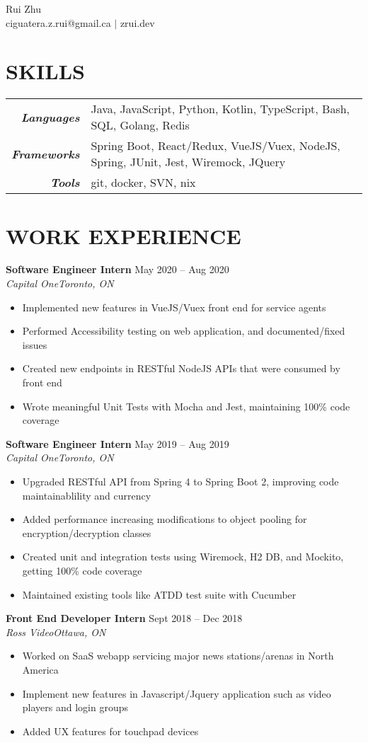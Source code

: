 \documentclass[8pt, letterpaper]{article}
\newcommand{\Header}[2]{\begin{center}
	\Huge\usefont{OT1}{lmss}{s}{n}
		#1 \\
	\small #2 \\
	\normalsize \normalfont
\end{center}}
\newcommand{\SplitEntry}[2]{\textbf{\textit{#1}} & #2\\}
\newcommand{\NewPart}[1]{\section*{\uppercase{\textbf{#1}}}}
\newcommand{\DatedEntry}[5]{\large\textbf{#1}
	\hfill #2\\\normalsize
	\textit{#3}\hfill\textit{#4}\\\vspace{0.10cm}
	#5
}
\begin{document}
\Header{Rui Zhu}{ciguatera.z.rui@gmail.ca $|$ zrui.dev}


\NewPart{Skills}{}
\begin{tabular}{r|l}
	\SplitEntry{Languages}{Java, JavaScript, Python, Kotlin, TypeScript, Bash, SQL, Golang, Redis}
	\SplitEntry{Frameworks}{Spring Boot, React/Redux, VueJS/Vuex, NodeJS, Spring, JUnit, Jest, Wiremock, JQuery}
	\SplitEntry{Tools}{git, docker, SVN, nix}
\end{tabular}


\NewPart{Work Experience}{}
\DatedEntry{Software Engineer Intern}
{May 2020 -- Aug 2020}
{Capital One}
{Toronto, ON}
{\begin{itemize}[nolistsep]
	\item Implemented new features in VueJS/Vuex front end for service agents 
	\item Performed Accessibility testing on web application, and documented/fixed issues
	\item Created new endpoints in RESTful NodeJS APIs that were consumed by front end
	\item Wrote meaningful Unit Tests with Mocha and Jest, maintaining 100\% code coverage
\end{itemize}}
\DatedEntry{Software Engineer Intern}
{May 2019 -- Aug 2019}
{Capital One}
{Toronto, ON}
{\begin{itemize}[nolistsep]
	\item Upgraded RESTful API from Spring 4 to Spring Boot 2, improving code maintainablility and currency
	\item Added performance increasing modifications to object pooling for encryption/decryption classes
	\item Created unit and integration tests using Wiremock, H2 DB, and Mockito, getting 100\% code coverage
	\item Maintained existing tools like ATDD test suite with Cucumber
\end{itemize}}
\DatedEntry{Front End Developer Intern}
{Sept 2018 -- Dec 2018}
{Ross Video}
{Ottawa, ON}
{\begin{itemize}[nolistsep]
	\item Worked on SaaS webapp servicing major news stations/arenas in North America
	\item Implement new features in Javascript/Jquery application such as video players and login groups
	\item Added UX features for touchpad devices
\end{itemize}}
\end{document}
